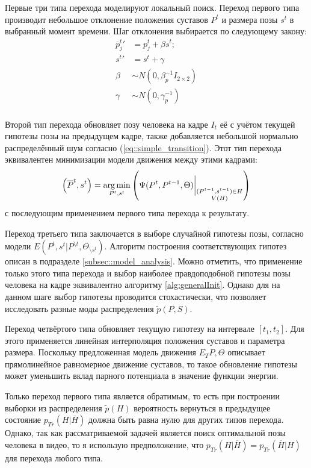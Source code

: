 Первые три типа перехода моделируют локальный поиск. Переход первого типа производит небольшое отклонение положения суставов $P^t$ и размера позы $s^t$ в выбранный момент времени. Шаг отклонения выбирается по следующему закону:
\begin{equation} \label{eq::simple_transition}
	\begin{aligned}
		{\overline{p}^t_j}' &= p^t_j + \beta s^t; \\
		{s^t}' &= s^t + \gamma \\
		\beta &\sim N(0, \beta_p^{-1} I_{2 \times 2}) \\
		\gamma &\sim N(0, \gamma_p^{-1}) \\
	\end{aligned}
\end{equation}

Второй тип перехода обновляет позу человека на кадре $I_t$ её с учётом текущей гипотезы позы на предыдущем кадре, также добавляется небольшой нормально распределённый шум согласно (\ref{eq::simple_transition}). Этот тип перехода эквивалентен минимизации модели движения между этими кадрами:
\begin{equation}
	\left(\overline{P}^t, s^t\right) = \operatorname*{arg\,min}_{P^t, s^t}\left(\Psi(P^t, P^{t-1}, \Theta)\bigg\rvert_{\substack{(P^{t-1}, s^{t-1}) \in H \\ V(H)}}\right)
\end{equation}
с последующим применением первого типа перехода к результату.

Переход третьего типа заключается в выборе случайной гипотезы позы, согласно модели $E(P^t, s^t | P^{\setminus t}, \Theta_{\setminus s^t})$. Алгоритм построения соответствующих гипотез описан в подразделе \ref{subsec::model_analysis}. Можно отметить, что применение только этого типа перехода и выбор наиболее правдоподобной гипотезы позы человека на кадре эквивалентно алгоритму \ref{alg:generalInit}. Однако для на данном шаге выбор гипотезы проводится стохастически, что позволяет исследовать разные моды распределения $\tilde{p}(P, S)$.

Переход четвёртого типа обновляет текущую гипотезу на интервале $\left[t_1, t_2\right]$. Для этого применяется линейная интерполяция положения суставов и параметра размера. Поскольку предложенная модель движения $E_T{P, \Theta}$ описывает прямолинейное равномерное движение суставов, то такое обновление гипотезы может уменьшить вклад парного потенциала в значение функции энергии.

Только переход первого типа является обратимым, то есть при построении выборки из распределения $\tilde{p}(H)$ вероятность вернуться в предыдущее состояние $p_{Tr}(H|\overline{H})$ должна быть равна нулю для других типов перехода. Однако, так как рассматриваемой задачей является поиск оптимальной позы человека в видео, то я использую предположение, что $p_{Tr}(H|\overline{H}) = p_{Tr}(\overline{H} | H)$ для перехода любого типа.

